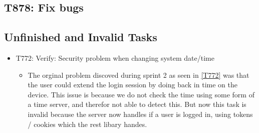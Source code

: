 

\subsection{T878: Fix bugs}

\subsection{Unfinished and Invalid Tasks}\label{S4Invalid}
\begin{itemize}
  \item T772: Verify: Security problem when changing system date/time
  \begin{itemize}
  	\item The orginal problem discoved during sprint 2 as seen in \autoref{T772}
 	was that the user could extend the login session by doing back in time on the
  	device.
	This issue is because we do not check the time using some form of a time
	server, and therefor not able to detect this.  
	But now this task is invalid because the server now handles if a user is logged
	in, using tokens / cookies which the rest libary handes.
\end{itemize}

\end{itemize}

